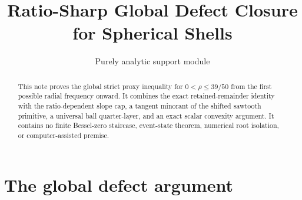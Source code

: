 \documentclass[11pt]{article}
\title{Ratio-Sharp Global Defect Closure for Spherical Shells}
\author{}
\date{Purely analytic support module}
\theoremstyle{remark}
\begin{document}
\maketitle

\begin{abstract}
This note proves the global strict proxy inequality for
$0<\rho\leq39/50$ from the first possible radial frequency onward.  It
combines the exact retained-remainder identity with the ratio-dependent
slope cap, a tangent minorant of the shifted sawtooth primitive, a universal
ball quarter-layer, and an exact scalar convexity argument.  It contains no
finite Bessel-zero staircase, event-state theorem, numerical root isolation,
or computer-assisted premise.
\end{abstract}

\section{The global defect argument}


\end{document}
